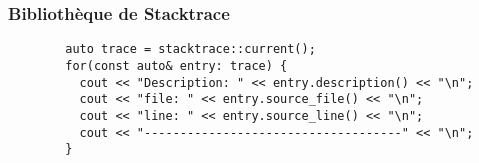 \documentclass[C++.tex]{subfiles}
\begin{document}
\begin{frame}[fragile]
	\frametitle{Bibliothèque de Stacktrace}
	\begin{verbatim}
		auto trace = stacktrace::current();
		for(const auto& entry: trace) {
		  cout << "Description: " << entry.description() << "\n";
		  cout << "file: " << entry.source_file() << "\n";
		  cout << "line: " << entry.source_line() << "\n";
		  cout << "------------------------------------" << "\n";
		}
	\end{verbatim}


\end{frame}
\end{document}

